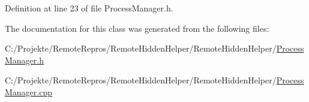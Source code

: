Definition at line 23 of file Process\+Manager.\+h.



The documentation for this class was generated from the following files\+:\begin{DoxyCompactItemize}
\item 
C\+:/\+Projekte/\+Remote\+Repros/\+Remote\+Hidden\+Helper/\+Remote\+Hidden\+Helper/\hyperlink{_process_manager_8h}{Process\+Manager.\+h}\item 
C\+:/\+Projekte/\+Remote\+Repros/\+Remote\+Hidden\+Helper/\+Remote\+Hidden\+Helper/\hyperlink{_process_manager_8cpp}{Process\+Manager.\+cpp}\end{DoxyCompactItemize}
